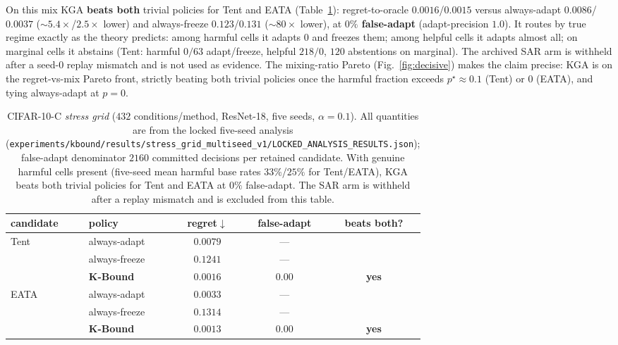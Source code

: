 \documentclass[conference]{IEEEtran}
\theoremstyle{plain}
\theoremstyle{definition}
\begin{document}
On this mix \textsc{KGA} \textbf{beats both} trivial policies for Tent and EATA
(Table~\ref{tab:decisive}): regret-to-oracle $0.0016$/$0.0015$ versus always-adapt
$0.0086$/$0.0037$ ($\sim$$5.4\times$/$2.5\times$ lower) and always-freeze $0.123$/$0.131$
($\sim$$80\times$ lower), at \textbf{$0\%$ false-adapt} (adapt-precision $1.0$). It routes by
true regime exactly as the theory predicts: among harmful cells it adapts $0$ and freezes
them; among helpful cells it adapts almost all; on marginal cells it abstains (Tent: harmful
$0/63$ adapt/freeze, helpful $218/0$, $120$ abstentions on marginal). The archived SAR arm is
withheld after a seed-0 replay mismatch and is not used as evidence. The mixing-ratio Pareto
(Fig.~\ref{fig:decisive}) makes the claim precise: \textsc{KGA} is on the regret-vs-mix
Pareto front, strictly beating both trivial policies once the harmful fraction exceeds
$p^\star\!\approx\!0.1$ (Tent) or $0$ (EATA), and tying always-adapt at $p{=}0$.

\begin{table}[t]\centering\small
\begin{tabular}{llccc}
\toprule
candidate & policy & regret$\downarrow$ & false-adapt & beats both? \\
\midrule
Tent & always-adapt  & $0.0079$ & --- & \\
     & always-freeze & $0.1241$ & --- & \\
     & \textbf{K-Bound} & $\mathbf{0.0016}$ & $\mathbf{0.00}$ & \textbf{yes} \\
\midrule
EATA & always-adapt  & $0.0033$ & --- & \\
     & always-freeze & $0.1314$ & --- & \\
     & \textbf{K-Bound} & $\mathbf{0.0013}$ & $\mathbf{0.00}$ & \textbf{yes} \\
\bottomrule
\end{tabular}
\caption{CIFAR-10-C \emph{stress grid} ($432$ conditions/method, ResNet-18, five seeds,
$\alpha{=}0.1$). All quantities are from the locked five-seed analysis
(\texttt{experiments/kbound/results/stress\_grid\_multiseed\_v1/LOCKED\_ANALYSIS\_RESULTS.json});
false-adapt denominator $2160$ committed decisions per retained candidate. With genuine harmful cells
present (five-seed mean harmful base rates $33\%$/$25\%$ for Tent/EATA),
\textsc{KGA} beats both trivial policies for Tent and EATA at $0\%$ false-adapt. The SAR arm is
withheld after a replay mismatch and is excluded from this table.}
\label{tab:decisive}
\end{table}
\end{document}
